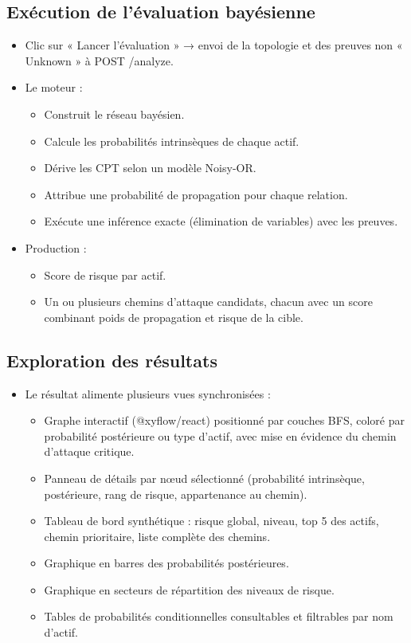 \documentclass[12pt,a4paper]{article}
\newcommand{\forcereset}[1]{%
    \needspace{#1\baselineskip}%
}
\begin{document}
\subsection{Exécution de l'évaluation bayésienne}
\forcereset{5}
\begin{itemize}[leftmargin=1.2cm, itemsep=0.2\baselineskip]
    \item Clic sur « Lancer l'évaluation » → envoi de la topologie et des preuves non « Unknown » à POST /analyze.
    \item Le moteur :
        \begin{itemize}
            \item Construit le réseau bayésien.
            \item Calcule les probabilités intrinsèques de chaque actif.
            \item Dérive les CPT selon un modèle Noisy-OR.
            \item Attribue une probabilité de propagation pour chaque relation.
            \item Exécute une inférence exacte (élimination de variables) avec les preuves.
        \end{itemize}
    \item Production :
        \begin{itemize}
            \item Score de risque par actif.
            \item Un ou plusieurs chemins d'attaque candidats, chacun avec un score combinant poids de propagation et risque de la cible.
        \end{itemize}
\end{itemize}

\newpage
\subsection{Exploration des résultats}
\forcereset{4}
\begin{itemize}[leftmargin=1.2cm, itemsep=0.2\baselineskip]
    \item Le résultat alimente plusieurs vues synchronisées :
        \begin{itemize}
            \item Graphe interactif (@xyflow/react) positionné par couches BFS, coloré par probabilité postérieure ou type d'actif, avec mise en évidence du chemin d'attaque critique.
            \item Panneau de détails par nœud sélectionné (probabilité intrinsèque, postérieure, rang de risque, appartenance au chemin).
            \item Tableau de bord synthétique : risque global, niveau, top 5 des actifs, chemin prioritaire, liste complète des chemins.
            \item Graphique en barres des probabilités postérieures.
            \item Graphique en secteurs de répartition des niveaux de risque.
            \item Tables de probabilités conditionnelles consultables et filtrables par nom d'actif.
        \end{itemize}
\end{itemize}
\end{document}
